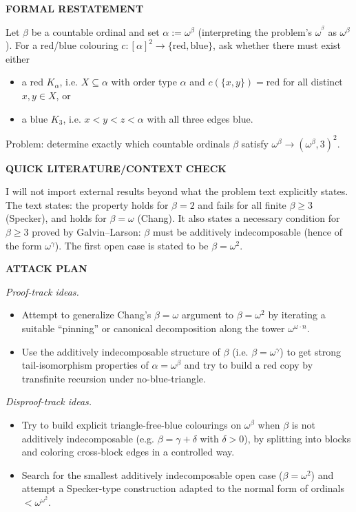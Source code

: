 \bigskip
\noindent\textbf{FORMAL RESTATEMENT}

Let $\beta$ be a countable ordinal and set $\alpha:=\omega^\beta$ (interpreting the problem's $\omega^{^\beta}$ as $\omega^\beta$).
For a red/blue colouring $c:[\alpha]^2\to\{\text{red},\text{blue}\}$, ask whether there must exist either
\begin{itemize}
\item a red $K_\alpha$, i.e. $X\subseteq\alpha$ with order type $\alpha$ and $c(\{x,y\})=\text{red}$ for all distinct $x,y\in X$, or
\item a blue $K_3$, i.e. $x<y<z<\alpha$ with all three edges blue.
\end{itemize}

Problem: determine exactly which countable ordinals $\beta$ satisfy $\omega^\beta\to(\omega^\beta,3)^2$.

\bigskip
\noindent\textbf{QUICK LITERATURE/CONTEXT CHECK}

I will not import external results beyond what the problem text explicitly states.
The text states: the property holds for $\beta=2$ and fails for all finite $\beta\ge 3$ (Specker), and holds for $\beta=\omega$ (Chang).
It also states a necessary condition for $\beta\ge 3$ proved by Galvin--Larson: $\beta$ must be additively indecomposable (hence of the form $\omega^\gamma$).
The first open case is stated to be $\beta=\omega^2$.

\bigskip
\noindent\textbf{ATTACK PLAN}

\emph{Proof-track ideas.}
\begin{itemize}
\item Attempt to generalize Chang's $\beta=\omega$ argument to $\beta=\omega^2$ by iterating a suitable ``pinning'' or canonical decomposition along the tower $\omega^{\omega\cdot n}$.
\item Use the additively indecomposable structure of $\beta$ (i.e. $\beta=\omega^\gamma$) to get strong tail-isomorphism properties of $\alpha=\omega^\beta$ and try to build a red copy by transfinite recursion under no-blue-triangle.
\end{itemize}

\emph{Disproof-track ideas.}
\begin{itemize}
\item Try to build explicit triangle-free-blue colourings on $\omega^\beta$ when $\beta$ is not additively indecomposable (e.g. $\beta=\gamma+\delta$ with $\delta>0$), by splitting into blocks and coloring cross-block edges in a controlled way.
\item Search for the smallest additively indecomposable open case ($\beta=\omega^2$) and attempt a Specker-type construction adapted to the normal form of ordinals $<\omega^{\omega^2}$.
\end{itemize}

